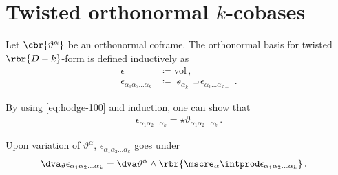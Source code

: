 \documentclass[a4paper]{article}
\begin{document}
\section{Twisted orthonormal $k$-cobases}
Let $\cbr{\vartheta^{\alpha}}$ be an orthonormal coframe. The orthonormal 
basis for twisted $\rbr{D-k}$-form is defined inductively as
\begin{align}
\epsilon &\coloneqq \mathrm{vol}\,, \\
\epsilon_{\alpha_{1}\alpha_{2}\ldots \alpha_{k}} &\coloneqq
\mscre_{\alpha_{k}} \intprod \epsilon_{\alpha_{1}\ldots \alpha_{k-1}}\,.
\end{align}

By using \cref{eq:hodge-100} and induction, one can show that
\begin{align}
\epsilon_{\alpha_{1}\alpha_{2}\ldots \alpha_{k}} =
\star \vartheta_{\alpha_{1}\alpha_{2}\ldots \alpha_{k}}\,.
\end{align}

Upon variation of $\vartheta^{\alpha}$, $\epsilon_{\alpha_{1}\alpha_{2}\ldots 
\alpha_{k}}$ goes under \cite[sec.\ A.2]{Muench1998}
\begin{align}
\dva_{\vartheta} \epsilon_{\alpha_{1}\alpha_{2}\ldots \alpha_{k}} &=
\dva \vartheta^{\alpha} \wedge \rbr{\mscre_{\alpha}\intprod 
	\epsilon_{\alpha_{1}\alpha_{2}\ldots \alpha_{k}}}\,.
\end{align}



%


\printbibliography
\end{document}

